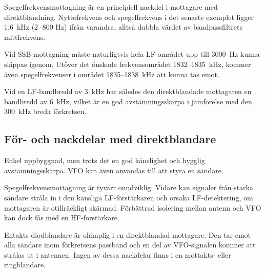 Spegelfrekvensmottagning är en principiell nackdel i mottagare med
direktblandning.
Nyttofrekvens och spegelfrekvens i det senaste exemplet ligger 1,6~kHz
(\(2 \cdot 800\) Hz) ifrån varandra, alltså dubbla värdet av bandpassfiltrets
mittfrekvens.

Vid SSB-mottagning måste naturligtvis hela LF-området upp till 3000~Hz
kunna släppas igenom.
Utöver det önskade frekvensområdet 1832--1835~kHz, kommer även spegelfrekvenser
i området 1835--1838~kHz att kunna tas emot.

Vid en LF-bandbredd av 3~kHz har således den direktblandade mottagaren
en bandbredd av 6~kHz, vilket är en god avstämningsskärpa i jämförelse
med den 300~kHz breda förkretsen.

\subsection{För- och nackdelar med direktblandare}

Enkel uppbyggnad, men trots det en god känslighet och hygglig avstämningsskärpa.
VFO kan även användas till att styra en sändare.

Spegelfrekvensmottagning är tyvärr oundviklig.
Vidare kan signaler från starka sändare stråla in i den känsliga
LF-förstärkaren och orsaka LF-detektering, om mottagaren är otillräckligt
skärmad.
Förbättrad isolering mellan antenn och VFO kan dock fås med en HF-förstärkare.

Entakts diodblandare är olämplig i en direktblandad mottagare.
Den tar emot alla sändare inom förkretsens passband och en del av VFO-signalen
kommer att strålas ut i antennen.
Ingen av dessa nackdelar finns i en mottakts- eller ringblandare.

